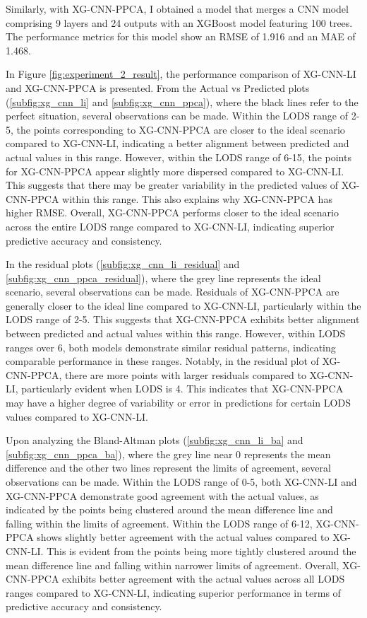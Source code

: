 \documentclass[12pt,a4paper,english
]{tunithesis}
\begin{document}
Similarly, with XG-CNN-PPCA, I obtained a model that merges a CNN model comprising 9 layers and 24 outputs with an XGBoost model featuring 100 trees. The performance metrics for this model show an RMSE of 1.916 and an MAE of 1.468.

In Figure \ref{fig:experiment_2_result}, the performance comparison of XG-CNN-LI and XG-CNN-PPCA is presented. From the Actual vs Predicted plots (\ref{subfig:xg_cnn_li} and \ref{subfig:xg_cnn_ppca}), where the black lines refer to the perfect situation, several observations can be made. Within the LODS range of 2-5, the points corresponding to XG-CNN-PPCA are closer to the ideal scenario compared to XG-CNN-LI, indicating a better alignment between predicted and actual values in this range. However, within the LODS range of 6-15, the points for XG-CNN-PPCA appear slightly more dispersed compared to XG-CNN-LI. This suggests that there may be greater variability in the predicted values of XG-CNN-PPCA within this range. This also explains why XG-CNN-PPCA has higher RMSE. Overall, XG-CNN-PPCA performs closer to the ideal scenario across the entire LODS range compared to XG-CNN-LI, indicating superior predictive accuracy and consistency.

In the residual plots (\ref{subfig:xg_cnn_li_residual} and \ref{subfig:xg_cnn_ppca_residual}), where the grey line represents the ideal scenario, several observations can be made. Residuals of XG-CNN-PPCA are generally closer to the ideal line compared to XG-CNN-LI, particularly within the LODS range of 2-5. This suggests that XG-CNN-PPCA exhibits better alignment between predicted and actual values within this range. However, within LODS ranges over 6, both models demonstrate similar residual patterns, indicating comparable performance in these ranges. Notably, in the residual plot of XG-CNN-PPCA, there are more points with larger residuals compared to XG-CNN-LI, particularly evident when LODS is 4. This indicates that XG-CNN-PPCA may have a higher degree of variability or error in predictions for certain LODS values compared to XG-CNN-LI.


Upon analyzing the Bland-Altman plots (\ref{subfig:xg_cnn_li_ba} and \ref{subfig:xg_cnn_ppca_ba}), where the grey line near 0 represents the mean difference and the other two lines represent the limits of agreement, several observations can be made. Within the LODS range of 0-5, both XG-CNN-LI and XG-CNN-PPCA demonstrate good agreement with the actual values, as indicated by the points being clustered around the mean difference line and falling within the limits of agreement. Within the LODS range of 6-12, XG-CNN-PPCA shows slightly better agreement with the actual values compared to XG-CNN-LI. This is evident from the points being more tightly clustered around the mean difference line and falling within narrower limits of agreement. Overall, XG-CNN-PPCA exhibits better agreement with the actual values across all LODS ranges compared to XG-CNN-LI, indicating superior performance in terms of predictive accuracy and consistency.
\end{document}
